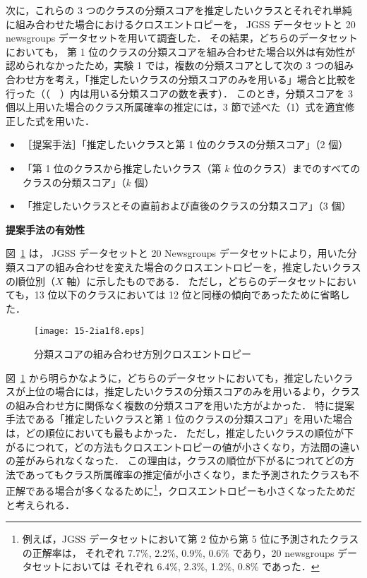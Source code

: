\documentclass[japanese]{jnlp_1.4}
\begin{document}
次に，これらの 3 つのクラスの分類スコアを推定したいクラスとそれぞれ単純に組み合わせた場合におけるクロスエントロピーを， JGSS データセットと 20 newsgroups データセットを用いて調査した．
その結果，どちらのデータセットにおいても，
第 1 位のクラスの分類スコアを組み合わせた場合以外は有効性が認められなかったため，実験 1 では，複数の分類スコアとして次の 3 つの組み合わせ方を考え，「推定したいクラスの分類スコアのみを用いる」場合と比較を行った（（　）内は用いる分類スコアの数を表す）．
このとき，分類スコアを 3 個以上用いた場合のクラス所属確率の推定には，3 節で述べた（1）式を適宜修正した式を用いた．
\begin{itemize}
\item ［提案手法］「推定したいクラスと第 1 位のクラスの分類スコア」（2 個） 

\item 「第 1 位のクラスから推定したいクラス（第 $k$ 位のクラス）までのすべてのクラスの分類スコア」（$k$ 個）

\item 「推定したいクラスとその直前および直後のクラスの分類スコア」（3 個）
\end{itemize}


\vspace{1\baselineskip}
\noindent
{\bf 提案手法の有効性}

図~\ref{rank2-12_JGSS_20ns} は，
JGSS データセットと 20 Newsgroups データセットにより，用いた分類スコアの組み合わせを変えた場合のクロスエントロピーを，推定したいクラスの順位別（$X$ 軸）に示したものである．
ただし，どちらのデータセットにおいても，13 位以下のクラスにおいては 12 位と同様の傾向であったために省略した．

\begin{figure}[b]
\begin{center}
\texttt{[image: 15-2ia1f8.eps]}
\caption{分類スコアの組み合わせ方別クロスエントロピー}
\label{rank2-12_JGSS_20ns}
\end{center}
\end{figure}



図~\ref{rank2-12_JGSS_20ns} から明らかなように，どちらのデータセットにおいても，推定したいクラスが上位の場合には，推定したいクラスの分類スコアのみを用いるより，クラスの組み合わせ方に関係なく複数の分類スコアを用いた方がよかった．
特に提案手法である「推定したいクラスと第 1 位のクラスの分類スコア」を用いた場合は，どの順位においても最もよかった．
ただし，推定したいクラスの順位が下がるにつれて，どの方法もクロスエントロピーの値が小さくなり，方法間の違いの差がみられなくなった．
この理由は，クラスの順位が下がるにつれてどの方法であってもクラス所属確率の推定値が小さくなり，また予測されたクラスも不正解である場合が多くなるために\footnote{
	例えば，JGSS データセットにおいて第 2 位から第 5 位に予測されたクラスの正解率は，
	それぞれ 7.7\%, 2.2\%, 0.9\%, 0.6\% であり，20 newsgroups データセットにおいては
	それぞれ 6.4\%, 2.3\%, 1.2\%, 0.8\% であった．
}，クロスエントロピーも小さくなったためだと考えられる．
\end{document}
